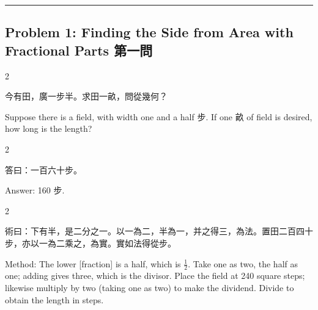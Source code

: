 \documentclass[10pt,a4paper]{article}
\newcommand{\longline}{\noindent\rule{\textwidth}{0.4pt}}
\begin{document}
\vspace{0.3cm}
\longline
\vspace{0.3cm}

\subsection{Problem 1: Finding the Side from Area with Fractional Parts 第一問}

\begin{paracol}{2}

\begin{leftcolumn*}
\begin{problembi}
今有田，廣一步半。求田一畝，問從幾何？
\end{problembi}
\end{leftcolumn*}

\begin{rightcolumn*}
\begin{problembi}
Suppose there is a field, with width one and a half 步. If one 畝 of field is desired, how long is the length?
\end{problembi}
\end{rightcolumn*}

\end{paracol}

\begin{paracol}{2}

\begin{leftcolumn*}
\begin{answerbi}[\textbf{答}]
答曰：一百六十步。
\end{answerbi}
\end{leftcolumn*}

\begin{rightcolumn*}
\begin{answerbi}
Answer: 160 步.
\end{answerbi}
\end{rightcolumn*}

\end{paracol}

\begin{paracol}{2}

\begin{leftcolumn*}
\begin{methodbi}[\textbf{術}]
術曰：下有半，是二分之一。以一為二，半為一，并之得三，為法。置田二百四十步，亦以一為二乘之，為實。實如法得從步。
\end{methodbi}
\end{leftcolumn*}

\begin{rightcolumn*}
\begin{methodbi}
Method: The lower [fraction] is a half, which is $\frac{1}{2}$. Take one as two, the half as one; adding gives three, which is the divisor. Place the field at 240 square steps; likewise multiply by two (taking one as two) to make the dividend. Divide to obtain the length in steps.
\end{methodbi}
\end{rightcolumn*}

\end{paracol}
\end{document}
